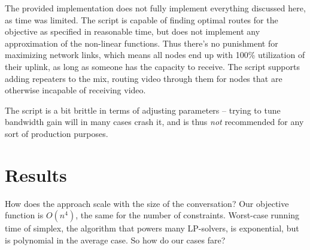 The provided implementation does not fully implement everything discussed here, as time was limited. The script is capable of finding optimal routes for the objective as specified in reasonable time, but does not implement any approximation of the non-linear functions. Thus there's no punishment for maximizing network links, which means all nodes end up with 100\% utilization of their uplink, as long as someone has the capacity to receive. The script supports adding repeaters to the mix, routing video through them for nodes that are otherwise incapable of receiving video.

The script is a bit brittle in terms of adjusting parameters -- trying to tune bandwidth gain will in many cases crash it, and is thus \emph{not} recommended for any sort of production purposes.


\section{Results}\label{sec:results}

How does the approach scale with the size of the conversation? Our objective function is $O(n^4)$, the same for the number of constraints. Worst-case running time of simplex, the algorithm that powers many LP-solvers, is exponential, but is polynomial in the average case. So how do our cases fare?

